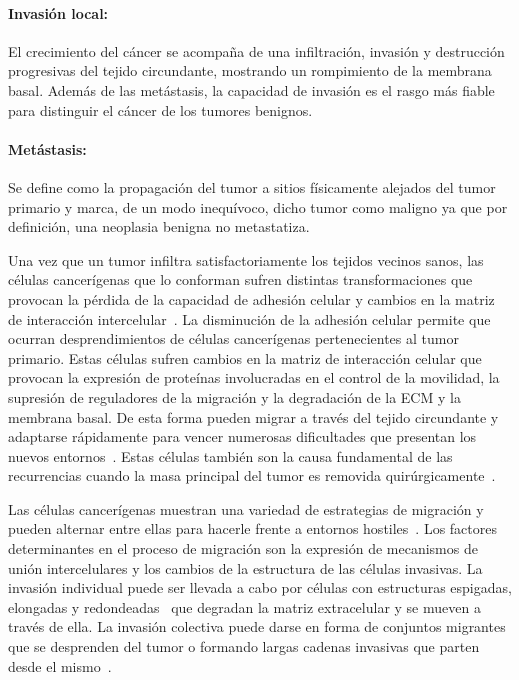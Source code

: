 \paragraph{Invasi\'on local:}El crecimiento del c\'ancer se acompa\~na de una infiltraci\'on, invasi\'on y destrucci\'on progresivas del tejido circundante, mostrando un rompimiento de la membrana basal. Adem\'as de las met\'astasis, la capacidad de invasi\'on es el rasgo m\'as fiable para distinguir el c\'ancer de los tumores benignos.

\paragraph{Met\'astasis:}Se define como la propagaci\'on del tumor a sitios f\'isicamente alejados del tumor primario y marca, de un modo inequ\'ivoco, dicho tumor como maligno ya que por definici\'on, una neoplasia benigna no metastatiza.\vspace*{0.5cm}

Una vez que un tumor infiltra satisfactoriamente los tejidos vecinos sanos, las c\'elulas cancer\'igenas que lo conforman sufren distintas transformaciones que provocan la p\'erdida de la capacidad de adhesi\'on celular y cambios en la matriz de interacci\'on intercelular~\cite{hanahan,invasion}. La disminuci\'on de la adhesi\'on celular permite que ocurran desprendimientos de c\'elulas cancer\'igenas pertenecientes al tumor primario. Estas c\'elulas sufren cambios en la matriz de interacci\'on celular que provocan la expresi\'on de prote\'inas involucradas en el control de la movilidad, la supresi\'on de reguladores de la migraci\'on y la degradaci\'on de la ECM y la membrana basal. De esta forma pueden migrar a trav\'es del tejido circundante y adaptarse r\'apidamente para vencer numerosas dificultades que presentan los nuevos entornos~\cite{hanahan,invasion}. Estas c\'elulas tambi\'en son la causa fundamental de las recurrencias cuando la masa principal del tumor es removida quir\'urgicamente~\cite{kansal3}. 

Las c\'elulas cancer\'igenas muestran una variedad de estrategias de migraci\'on y pueden alternar entre ellas para hacerle frente a entornos hostiles~\cite{migration}. Los factores determinantes en el proceso de migraci\'on son la expresi\'on de mecanismos de uni\'on intercelulares y los cambios de la estructura de las c\'elulas invasivas. La invasi\'on individual puede ser llevada a cabo por c\'elulas con estructuras espigadas, elongadas y redondeadas~\cite{migration} que degradan la matriz extracelular y se mueven a trav\'es de ella. La invasi\'on colectiva puede darse en forma de conjuntos migrantes que se desprenden del tumor o formando largas cadenas invasivas que parten desde el mismo~\cite{robins,hanahan,cancerbook}.

